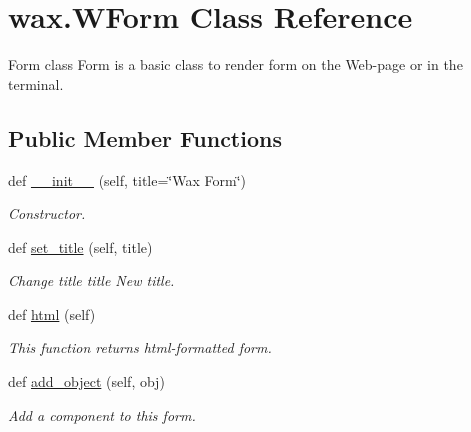 \hypertarget{classwax_1_1WForm}{}\section{wax.\+W\+Form Class Reference}
\label{classwax_1_1WForm}


Form class Form is a basic class to render form on the Web-\/page or in the terminal.  


\subsection*{Public Member Functions}
\begin{DoxyCompactItemize}
\item 
def \hyperlink{classwax_1_1WForm_a400e90df6e579a351b42a1deede3e998}{\+\_\+\+\_\+init\+\_\+\+\_\+} (self, title=\char`\"{}Wax Form\char`\"{})
\begin{DoxyCompactList}\small\item\em Constructor. \end{DoxyCompactList}\item 
def \hyperlink{classwax_1_1WForm_a900c258a7b86f9a0ff0bc581c0a9c3d0}{set\+\_\+title} (self, title)\hypertarget{classwax_1_1WForm_a900c258a7b86f9a0ff0bc581c0a9c3d0}{}\label{classwax_1_1WForm_a900c258a7b86f9a0ff0bc581c0a9c3d0}

\begin{DoxyCompactList}\small\item\em Change title title New title. \end{DoxyCompactList}\item 
def \hyperlink{classwax_1_1WForm_a3b36cb931fb67695e4d660d5d10da855}{html} (self)\hypertarget{classwax_1_1WForm_a3b36cb931fb67695e4d660d5d10da855}{}\label{classwax_1_1WForm_a3b36cb931fb67695e4d660d5d10da855}

\begin{DoxyCompactList}\small\item\em This function returns html-\/formatted form. \end{DoxyCompactList}\item 
def \hyperlink{classwax_1_1WForm_aceb0b7e3addedb8b531ae1faccf107e7}{add\+\_\+object} (self, obj)
\begin{DoxyCompactList}\small\item\em Add a component to this form. \end{DoxyCompactList}\end{DoxyCompactItemize}


